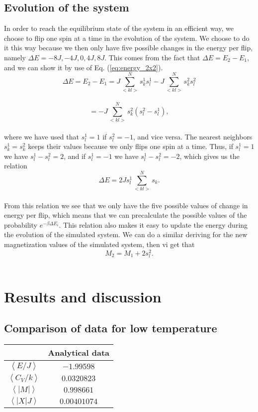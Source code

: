 \documentclass[12pt]{article}
\begin{document}
\begin{flushleft}
\subsection{Evolution of the system}
In order to reach the equilibrium state of the system in an efficient way, we choose to flip one spin at a time in the evolution of the system. We choose to do it this way because we then only have five possible changes in the energy per flip, namely $\Delta E = -8J, -4J, 0, 4J, 8J$. This comes from the fact that $\Delta E = E_2 - E_1$, and we can show it by use of Eq. (\ref{eq:energy_2x2}).
\vspace{5mm}
$$\Delta E = E_2 - E_1 = J\sum\limits_{<kl>}^{N}s_k^1 s_l^1 -J\sum\limits_{<kl>}^{N}s_k^2 s_l^2$$\\
\vspace{5mm}
$$ = -J\sum\limits_{<kl>}^{N} s_k^2(s_l^2 -  s_l^1),$$\\
\vspace{5mm}
where we have used that $s_l^1 = 1$ if $s_l^2 = -1$, and vice versa. The nearest neighbors $s_k^1 = s_k^2$ keeps their values because we only flips one spin at a time. Thus, if $s_l^1 = 1$ we have $s_l^1 - s_l^2 = 2$, and if $s_l^1 = -1$ we have $s_l^1 - s_l^2 = -2$, which gives us the relation
\vspace{5mm}
$$\Delta E = 2Js_l^1\sum\limits_{<kl>}^{N} s_k.$$\\
\vspace{5mm} 
From this relation we see that we only have the five possible values of change in energy per flip, which means that we can precalculate the possible values of the probability $e^{-\beta\Delta E_i}$. This relation also makes it easy to update the energy during the evolution of the simulated system. We can do a similar deriving for the new magnetization values of the simulated system, then vi get that
\vspace{5mm}
$$M_2 = M_1 + 2s_l^2.$$\\ 
\vspace{5mm}


\newpage
\section{Results and discussion}

\subsection{Comparison of data for low temperature}
\begin{table}[!h]
\begin{center}
\begin{tabular}{| c | c |}
	\hline
	 & \textbf{Analytical data} \\
	\hline	
	 $\left<E/J\right>$ & $-1.99598$\\
	 $\left<C_V/k\right>$ & $0.0320823$\\
	 $\left<|M|\right>$ & $0.998661$ \\
	 $\left<|X|J\right>$ & $0.00401074$\\


\end{tabular}
\end{center}
\end{table}
\end{flushleft}
\end{document}
